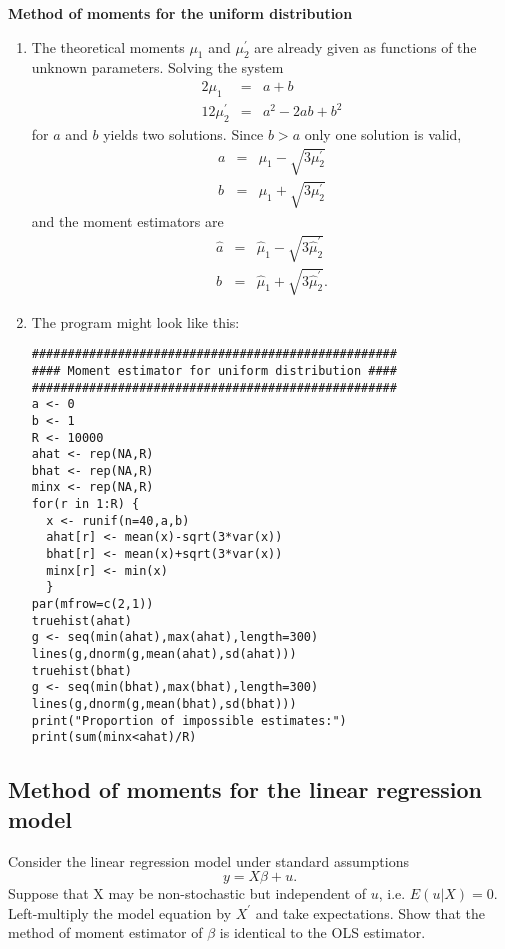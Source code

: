 \documentclass{article}
\begin{document}
\begin{solution}
\textbf{Method of moments for the uniform distribution}

\begin{enumerate}
\item The theoretical moments $\mu _{1}$ and $\mu _{2}^{\prime }$ are
already given as functions of the unknown parameters. Solving the system%
\begin{eqnarray*}
2\mu _{1} &=&a+b \\
12\mu _{2}^{\prime } &=&a^{2}-2ab+b^{2}
\end{eqnarray*}%
for $a$ and $b$ yields two solutions. Since $b>a$ only one solution is valid,%
\begin{eqnarray*}
a &=&\mu _{1}-\sqrt{3\mu _{2}^{\prime }} \\
b &=&\mu _{1}+\sqrt{3\mu _{2}^{\prime }}
\end{eqnarray*}%
and the moment estimators are%
\begin{eqnarray*}
\hat{a} &=&\hat{\mu}_{1}-\sqrt{3\hat{\mu}_{2}^{\prime }} \\
\hat{b} &=&\hat{\mu}_{1}+\sqrt{3\hat{\mu}_{2}^{\prime }}.
\end{eqnarray*}

\item The program might look like this:

\begin{verbatim}
###################################################
#### Moment estimator for uniform distribution ####
###################################################
a <- 0
b <- 1
R <- 10000
ahat <- rep(NA,R)
bhat <- rep(NA,R)
minx <- rep(NA,R)
for(r in 1:R) {
  x <- runif(n=40,a,b)
  ahat[r] <- mean(x)-sqrt(3*var(x))
  bhat[r] <- mean(x)+sqrt(3*var(x))
  minx[r] <- min(x)
  }
par(mfrow=c(2,1))
truehist(ahat)
g <- seq(min(ahat),max(ahat),length=300)
lines(g,dnorm(g,mean(ahat),sd(ahat)))
truehist(bhat)
g <- seq(min(bhat),max(bhat),length=300)
lines(g,dnorm(g,mean(bhat),sd(bhat)))
print("Proportion of impossible estimates:")
print(sum(minx<ahat)/R)
\end{verbatim}
\end{enumerate}
\end{solution}

\subsection{Method of moments for the linear regression model\label{MethodOfMomentsLinReg}}

Consider the linear regression model under standard assumptions%
\begin{equation*}
y=X\beta +u.
\end{equation*}%
Suppose that X may be non-stochastic but independent of $u$, i.e. $E(u|X) = 0$. Left-multiply the model equation by $X^{\prime }$ and take expectations.
Show that the method of moment estimator of $\beta $ is identical to the OLS
estimator.
\end{document}
